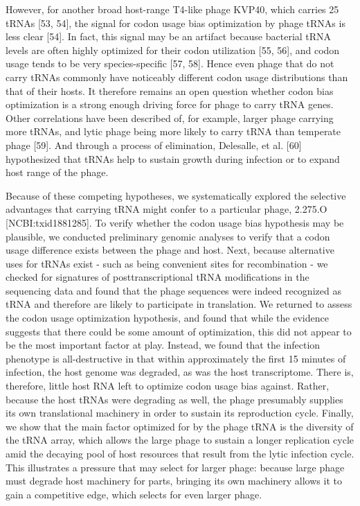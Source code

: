 \documentclass[12pt,twoside]{mitthesis-manusdown}
\begin{document}
However, for another broad host-range T4-like phage KVP40, which carries
25 tRNAs {[}53, 54{]}, the signal for codon usage bias optimization by
phage tRNAs is less clear {[}54{]}. In fact, this signal may be an
artifact because bacterial tRNA levels are often highly optimized for
their codon utilization {[}55, 56{]}, and codon usage tends to be very
species-specific {[}57, 58{]}. Hence even phage that do not carry tRNAs
commonly have noticeably different codon usage distributions than that
of their hosts. It therefore remains an open question whether codon bias
optimization is a strong enough driving force for phage to carry tRNA
genes. Other correlations have been described of, for example, larger
phage carrying more tRNAs, and lytic phage being more likely to carry
tRNA than temperate phage {[}59{]}. And through a process of
elimination, Delesalle, et al. {[}60{]} hypothesized that tRNAs help to
sustain growth during infection or to expand host range of the phage.

Because of these competing hypotheses, we systematically explored the
selective advantages that carrying tRNA might confer to a particular
phage, 2.275.O {[}NCBI:txid1881285{]}. To verify whether the codon usage
bias hypothesis may be plausible, we conducted preliminary genomic
analyses to verify that a codon usage difference exists between the
phage and host. Next, because alternative uses for tRNAs exist - such as
being convenient sites for recombination - we checked for signatures of
posttranscriptional tRNA modifications in the sequencing data and found
that the phage sequences were indeed recognized as tRNA and therefore
are likely to participate in translation. We returned to assess the
codon usage optimization hypothesis, and found that while the evidence
suggests that there could be some amount of optimization, this did not
appear to be the most important factor at play. Instead, we found that
the infection phenotype is all-destructive in that within approximately
the first 15 minutes of infection, the host genome was degraded, as was
the host transcriptome. There is, therefore, little host RNA left to
optimize codon usage bias against. Rather, because the host tRNAs were
degrading as well, the phage presumably supplies its own translational
machinery in order to sustain its reproduction cycle. Finally, we show
that the main factor optimized for by the phage tRNA is the diversity of
the tRNA array, which allows the large phage to sustain a longer
replication cycle amid the decaying pool of host resources that result
from the lytic infection cycle. This illustrates a pressure that may
select for larger phage: because large phage must degrade host machinery
for parts, bringing its own machinery allows it to gain a competitive
edge, which selects for even larger phage.
\end{document}
